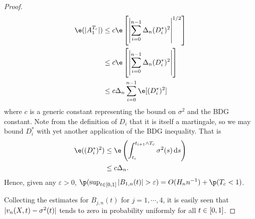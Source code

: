 \begin{proof}
\begin{align}
  \e(\vert A_1^{T_c}\vert ) & \le c\e\left[\left\vert\sumin \Delta_n(D_i^*)^2 \right\vert^{1/2} \right] \notag\\
  & \le c\e\left[\left\vert\sumin \Delta_n(D_i^*)^2 \right\vert \right] \notag\\
  & \le c\Delta_n\sumin\e[(D_i^*)^2]   
  \label{eq:ra1}
\end{align}
where $c$ is a generic constant representing the bound on $\sigma^2$ and the BDG constant.  Note  from the definition of  $D_i$  that it  is itself a martingale, so we may bound  $D^*_i$  with yet another application of the BDG inequality. That is
\begin{align}
  \e((D^*_i)^2) &\le \e\left(\int^{t_{i+1} \wedge T_c}_{t_i} \sigma^2(s) \D s\right) \notag\\
  &\le c \Delta_n. 
  \label{}
\end{align}
Hence, given any $\varepsilon > 0$,  $\p( \sup_{t \in [0,1]} \vert B_{1,n}(t) \vert > \varepsilon)  = O(H_n n^{-1}) + \p(T_c < 1)$.

Collecting the estimates for $B_{j,n}(t)$ for $j =1,\cdots,4$, it is easily seen that $\vert v_n(X, t) - \sigma^2(t) \vert$ tends to zero in probability uniformly  for all $t \in [0,1]$. 
\end{proof}
